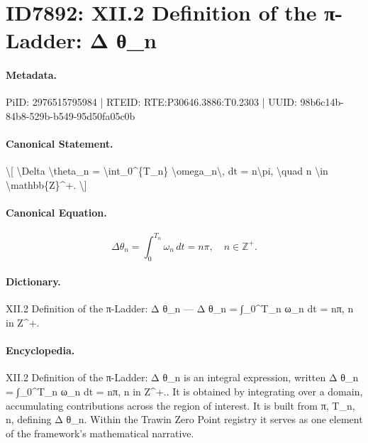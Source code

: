 \section*{ID7892: XII.2 Definition of the π-Ladder: Δ θ\_n}
\paragraph{Metadata.}
PiID: 2976515795984 | RTEID: RTE:P30646.3886:T0.2303 | UUID: 98b6c14b-84b8-529b-b549-95d50fa05c0b

\paragraph{Canonical Statement.}
\textbackslash{}[ \textbackslash{}Delta \textbackslash{}theta\_n = \textbackslash{}int\_0\textasciicircum{}\{T\_n\} \textbackslash{}omega\_n\textbackslash{}, dt = n\textbackslash{}pi, \textbackslash{}quad n \textbackslash{}in \textbackslash{}mathbb\{Z\}\textasciicircum{}+. \textbackslash{}]

\paragraph{Canonical Equation.}
\[
\Delta \theta_n = \int_0^{T_n} \omega_n\, dt = n\pi, \quad n \in \mathbb{Z}^+.
\]

\paragraph{Dictionary.}
XII.2 Definition of the π-Ladder: Δ θ\_n — Δ θ\_n = ∫\_0\textasciicircum{}T\_n ω\_n dt = nπ, n in Z\textasciicircum{}+.

\paragraph{Encyclopedia.}
XII.2 Definition of the π-Ladder: Δ θ\_n is an integral expression, written Δ θ\_n = ∫\_0\textasciicircum{}T\_n ω\_n dt = nπ, n in Z\textasciicircum{}+.. It is obtained by integrating over a domain, accumulating contributions across the region of interest. It is built from π, T\_n, n, defining Δ θ\_n. Within the Trawin Zero Point registry it serves as one element of the framework's mathematical narrative.
